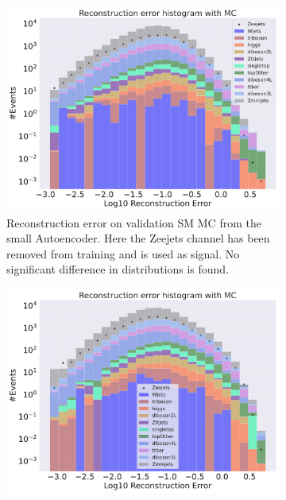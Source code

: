 \begin{figure}[H]
    \centering
    \begin{subfigure}{.45\textwidth}
        \includegraphics[width=\textwidth]{Figures/VAE_testing/small/b_data_recon_big_rm3_feats_sig_Zeejets.pdf}
        \caption{Reconstruction error on validation SM MC from the small Autoencoder. Here the Zeejets channel has been removed from training and 
        is used as signal. No significant difference in distributions is found.}
        \label{fig:vae_small_Zeejets}
    \end{subfigure}
    \hfill 
    \begin{subfigure}{.45\textwidth}
        \includegraphics[width=\textwidth]{Figures/VAE_testing/big/b_data_recon_big_rm3_feats_sig_Zeejets.pdf}

\end{subfigure}
\end{figure}
